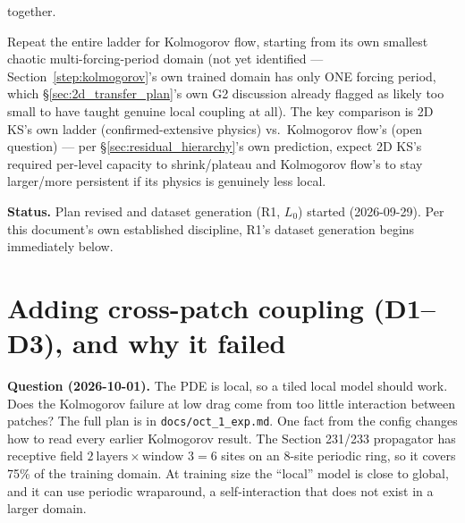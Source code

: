 \documentclass[11pt]{article}
\begin{document}
\begin{description}[style=nextline,leftmargin=1.2em]
together.
\item[R6 --- Kolmogorov flow, once R1--R5 validate the mechanism on
2D KS.] \label{exp:r6}
Repeat the entire ladder for Kolmogorov flow, starting from its own
smallest chaotic multi-forcing-period domain (not yet identified ---
Section~\ref{step:kolmogorov}'s own trained domain has only ONE forcing
period, which \S\ref{sec:2d_transfer_plan}'s own G2 discussion already
flagged as likely too small to have taught genuine local coupling at
all). The key comparison is 2D KS's own ladder (confirmed-extensive
physics) vs.\ Kolmogorov flow's (open question) --- per
\S\ref{sec:residual_hierarchy}'s own prediction, expect 2D KS's required
per-level capacity to shrink/plateau and Kolmogorov flow's to stay
larger/more persistent if its physics is genuinely less local.
\end{description}

\textbf{Status.} Plan revised and dataset generation (R1, $L_0$) started
(2026-09-29). Per this
document's own established discipline, R1's dataset generation begins
immediately below.

\section{Adding cross-patch coupling (D1--D3), and why it failed}
\label{sec:d1d3}

\textbf{Question (2026-10-01).} The PDE is local, so a tiled local model
should work. Does the Kolmogorov failure at low drag come from too little
interaction between patches? The full plan is in
\texttt{docs/oct\_1\_exp.md}. One fact from the config changes how to read
every earlier Kolmogorov result. The Section 231/233 propagator has
receptive field $2\ \text{layers}\times\text{window }3 = 6$ sites on an
8-site periodic ring, so it covers 75\% of the training domain. At training
size the ``local'' model is close to global, and it can use periodic
wraparound, a self-interaction that does not exist in a larger domain.
\end{document}
